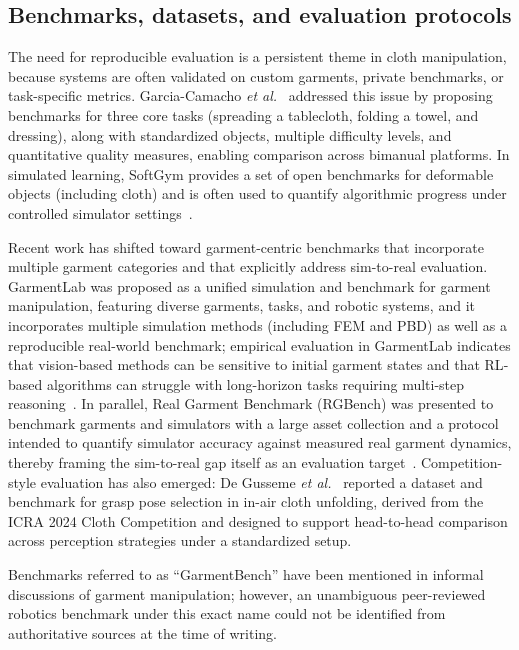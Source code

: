 \subsection{Benchmarks, datasets, and evaluation protocols}

The need for reproducible evaluation is a persistent theme in cloth manipulation, because systems are often validated on custom garments, private benchmarks, or task-specific metrics. Garcia-Camacho \emph{et al.}~\cite{GarciaCamacho2020ClothBenchmark} addressed this issue by proposing benchmarks for three core tasks (spreading a tablecloth, folding a towel, and dressing), along with standardized objects, multiple difficulty levels, and quantitative quality measures, enabling comparison across bimanual platforms. In simulated learning, SoftGym provides a set of open benchmarks for deformable objects (including cloth) and is often used to quantify algorithmic progress under controlled simulator settings~\cite{Lin2021SoftGym}.

Recent work has shifted toward garment-centric benchmarks that incorporate multiple garment categories and that explicitly address sim-to-real evaluation. GarmentLab was proposed as a unified simulation and benchmark for garment manipulation, featuring diverse garments, tasks, and robotic systems, and it incorporates multiple simulation methods (including \ac{FEM} and \ac{PBD}) as well as a reproducible real-world benchmark; empirical evaluation in GarmentLab indicates that vision-based methods can be sensitive to initial garment states and that \ac{RL}-based algorithms can struggle with long-horizon tasks requiring multi-step reasoning~\cite{Lu2024GarmentLab}. In parallel, Real Garment Benchmark (RGBench) was presented to benchmark garments and simulators with a large asset collection and a protocol intended to quantify simulator accuracy against measured real garment dynamics, thereby framing the sim-to-real gap itself as an evaluation target~\cite{Hu2025RGBench}. Competition-style evaluation has also emerged: De Gusseme \emph{et al.}~\cite{DeGusseme2026ClothCompetition} reported a dataset and benchmark for grasp pose selection in in-air cloth unfolding, derived from the ICRA 2024 Cloth Competition and designed to support head-to-head comparison across perception strategies under a standardized setup.

Benchmarks referred to as ``GarmentBench'' have been mentioned in informal discussions of garment manipulation; however, an unambiguous peer-reviewed robotics benchmark under this exact name could not be identified from authoritative sources at the time of writing. %

